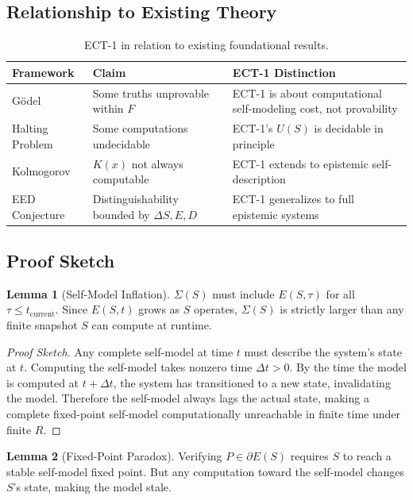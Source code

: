 \documentclass[12pt]{article}
\theoremstyle{definition}
\newtheorem{lemma}{Lemma}[section]
\newcommand{\ES}{E(S, t)}
\newcommand{\SM}{\Sigma(S)}
\newcommand{\EB}{\partial E(S)}
\newcommand{\US}{U(S)}
\begin{document}
\subsection{Relationship to Existing Theory}

\begin{table}[h]
\centering
\renewcommand{\arraystretch}{1.4}
\begin{tabular}{@{} p{3cm} p{4.5cm} p{5cm} @{}}
\toprule
\textbf{Framework} & \textbf{Claim} & \textbf{ECT-1 Distinction} \\
\midrule
G\"{o}del & Some truths unprovable within $F$ & ECT-1 is about computational self-modeling cost, not provability \\
Halting Problem & Some computations undecidable & ECT-1's $\US$ is decidable in principle \\
Kolmogorov & $K(x)$ not always computable & ECT-1 extends to epistemic self-description \\
EED Conjecture & Distinguishability bounded by $\Delta S, E, D$ & ECT-1 generalizes to full epistemic systems \\
\bottomrule
\end{tabular}
\caption{ECT-1 in relation to existing foundational results.}
\end{table}

\subsection{Proof Sketch}

\begin{lemma}[Self-Model Inflation]
$\SM$ must include $E(S, \tau)$ for all $\tau \leq t_{\mathrm{current}}$. Since $\ES$ grows as $S$ operates, $\SM$ is strictly larger than any finite snapshot $S$ can compute at runtime.
\end{lemma}

\begin{proof}[Proof Sketch]
Any complete self-model at time $t$ must describe the system's state at $t$. Computing the self-model takes nonzero time $\Delta t > 0$. By the time the model is computed at $t + \Delta t$, the system has transitioned to a new state, invalidating the model. Therefore the self-model always lags the actual state, making a complete fixed-point self-model computationally unreachable in finite time under finite $R$.
\end{proof}

\begin{lemma}[Fixed-Point Paradox]
Verifying $P \in \EB$ requires $S$ to reach a stable self-model fixed point. But any computation toward the self-model changes $S$'s state, making the model stale.
\end{lemma}
\end{document}
